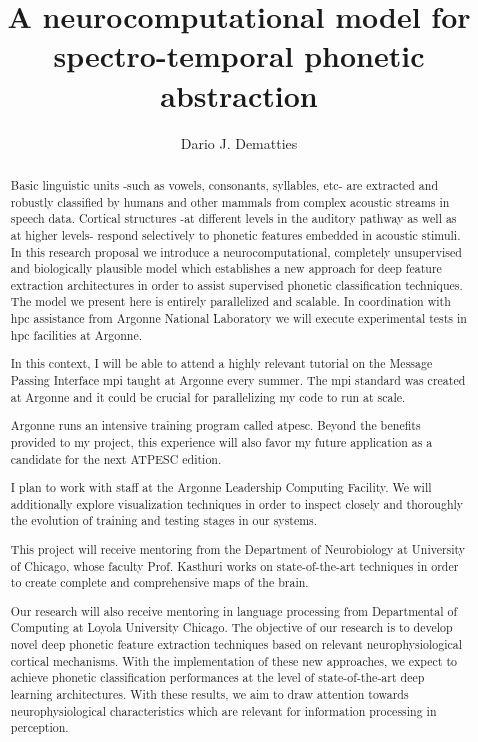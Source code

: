 \documentclass[11pt,a4paper]{article}
\title{A neurocomputational model for spectro-temporal phonetic abstraction}
\author[1]{Dario J. Dematties}
\affil[1]{Instituto de Ingeniería Biomédica, Facultad de Ingeniería, Universidad de Buenos Aires,
Ciudad Autonoma de Buenos Aires, Buenos Aires, Argentina}
\begin{document}
\linenumbers


\maketitle

\begin{abstract}
Basic linguistic units -such as vowels, consonants, syllables, etc-
are extracted and robustly classified by humans and other mammals
from complex acoustic streams in speech data.
Cortical structures -at different levels in the auditory pathway as well as at higher levels-
respond selectively to phonetic features embedded in acoustic stimuli.
In this research proposal we introduce a neurocomputational,
completely unsupervised and biologically plausible model
which establishes a new approach for deep feature extraction
architectures in order to assist supervised phonetic classification
techniques.
The model we present here is entirely parallelized and scalable.
In coordination with \gls{hpc} assistance from Argonne National Laboratory
we will execute experimental tests in \gls{hpc} facilities at Argonne.


In this context, I will be able to attend a highly relevant tutorial on the Message Passing Interface \gls{mpi}  taught at Argonne every summer. The \gls{mpi} standard was created at Argonne and it could be crucial for parallelizing my code to run at scale.


Argonne runs an intensive training program called \gls{atpesc}. Beyond the benefits provided to my project,
this experience will also favor my future application as a candidate
for the next ATPESC edition. 




I plan to work with staff at the Argonne Leadership Computing Facility. We will additionally explore visualization techniques
in order to inspect closely and thoroughly the evolution of
training and testing stages
in our systems.

This project will receive mentoring from the Department of Neurobiology at
University of Chicago, whose faculty Prof. Kasthuri works on state-of-the-art
techniques in order to create complete and comprehensive maps of the brain.

Our research will also receive mentoring in language processing
from Departmental of Computing at
Loyola University Chicago.
The objective of our research is to develop novel deep phonetic
feature extraction techniques based on relevant neurophysiological
cortical mechanisms.
With the implementation of these new approaches, we expect to
achieve phonetic classification performances at the level of state-of-the-art deep learning architectures. 
With these results, we aim to draw attention 
towards neurophysiological characteristics which are
relevant for information processing in perception.
\end{abstract}
\end{document}
